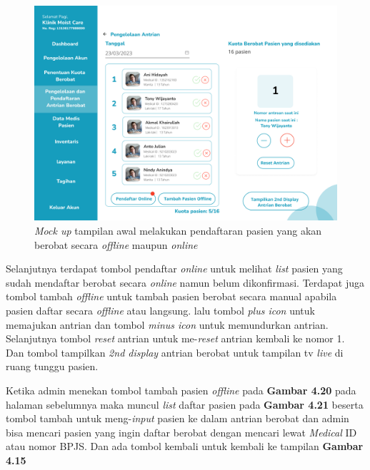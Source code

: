 \begin{enumerate}
	\begin{figure}[H]
		\centering
		\includegraphics[width=12cm]{gambar/mockup_web/Pengelolaan Antrian Akun 2.png}
		\caption{\emph{Mock up} tampilan awal melakukan pendaftaran pasien yang akan berobat secara \emph{offline} maupun \emph{online}}
		\label{Gambar:pendaftaranakunberobat}
	\end{figure}

	Selanjutnya terdapat tombol pendaftar \emph{online} untuk melihat \emph{list} pasien yang sudah mendaftar berobat secara \emph{online} namun belum dikonfirmasi. Terdapat juga tombol tambah \emph{offline} untuk tambah pasien berobat secara manual apabila pasien daftar secara \emph{offline} atau langsung. lalu tombol \emph{plus icon} untuk memajukan antrian dan tombol \emph{minus icon} untuk memundurkan antrian. Selanjutnya tombol \emph{reset} antrian untuk me-\emph{reset} antrian kembali ke nomor 1. Dan tombol tampilkan \emph{2nd display} antrian berobat untuk tampilan tv \emph{live} di ruang tunggu pasien.
	
	Ketika admin menekan tombol tambah pasien \emph{offline} pada \textbf{Gambar 4.20} pada halaman sebelumnya maka muncul \emph{list} daftar pasien pada \textbf{Gambar 4.21} beserta tombol tambah untuk meng-\emph{input} pasien ke dalam antrian berobat dan admin bisa mencari pasien yang ingin daftar berobat dengan mencari lewat \emph{Medical} ID atau nomor BPJS. Dan ada tombol kembali untuk kembali ke tampilan \textbf{Gambar 4.15}
	

\end{enumerate}
